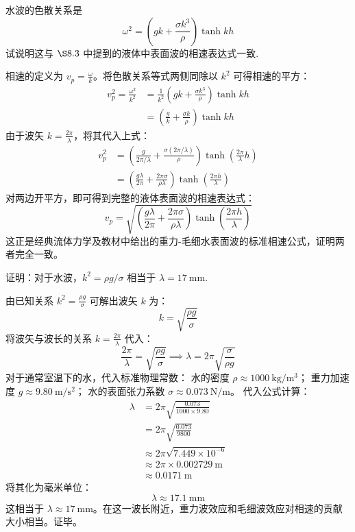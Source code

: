 \begin{exercise}\label{ex:8.8}
水波的色散关系是
$$\omega^2 = \left( gk + \frac{\sigma k^3}{\rho} \right) \tanh kh$$
试说明这与 $\S 8.3$ 中提到的液体中表面波的相速表达式一致.
\end{exercise}
\begin{solution}
相速的定义为 $v_p = \frac{\omega}{k}$。将色散关系等式两侧同除以 $k^2$ 可得相速的平方：
\begin{align*}
    v_p^2 = \frac{\omega^2}{k^2} &= \frac{1}{k^2} \left( gk + \frac{\sigma k^3}{\rho} \right) \tanh kh \\
    &= \left( \frac{g}{k} + \frac{\sigma k}{\rho} \right) \tanh kh
\end{align*}
由于波矢 $k = \frac{2\pi}{\lambda}$，将其代入上式：
\begin{align*}
    v_p^2 &= \left( \frac{g}{2\pi/\lambda} + \frac{\sigma (2\pi/\lambda)}{\rho} \right) \tanh\left( \frac{2\pi}{\lambda} h \right) \\
          &= \left( \frac{g\lambda}{2\pi} + \frac{2\pi\sigma}{\rho\lambda} \right) \tanh\left( \frac{2\pi h}{\lambda} \right)
\end{align*}
对两边开平方，即可得到完整的液体表面波的相速表达式：
$$ v_p = \sqrt{ \left( \frac{g\lambda}{2\pi} + \frac{2\pi\sigma}{\rho\lambda} \right) \tanh\left( \frac{2\pi h}{\lambda} \right) } $$
这正是经典流体力学及教材中给出的重力-毛细水表面波的标准相速公式，证明两者完全一致。
\end{solution}

\begin{exercise}\label{ex:8.9}
证明：对于水波，$k^2 = \rho g / \sigma$ 相当于 $\lambda = 17 \ \mathrm{mm}$.
\end{exercise}
\begin{solution}
由已知关系 $k^2 = \frac{\rho g}{\sigma}$ 可解出波矢 $k$ 为：
$$ k = \sqrt{\frac{\rho g}{\sigma}} $$
将波矢与波长的关系 $k = \frac{2\pi}{\lambda}$ 代入：
$$ \frac{2\pi}{\lambda} = \sqrt{\frac{\rho g}{\sigma}} \implies \lambda = 2\pi \sqrt{\frac{\sigma}{\rho g}} $$
对于通常室温下的水，代入标准物理常数：
水的密度 $\rho \approx 1000 \ \mathrm{kg/m^3}$；
重力加速度 $g \approx 9.80 \ \mathrm{m/s^2}$；
水的表面张力系数 $\sigma \approx 0.073 \ \mathrm{N/m}$。
代入公式计算：
\begin{align*}
    \lambda &= 2\pi \sqrt{\frac{0.073}{1000 \times 9.80}} \\
            &= 2\pi \sqrt{\frac{0.073}{9800}} \\
            &\approx 2\pi \sqrt{7.449 \times 10^{-6}} \\
            &\approx 2\pi \times 0.002729 \ \mathrm{m} \\
            &\approx 0.0171 \ \mathrm{m}
\end{align*}
将其化为毫米单位：
$$ \lambda \approx 17.1 \ \mathrm{mm} $$
这相当于 $\lambda \approx 17 \ \mathrm{mm}$。在这一波长附近，重力波效应和毛细波效应对相速的贡献大小相当。证毕。
\end{solution}


